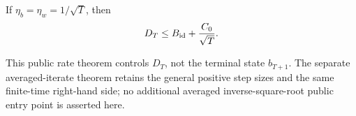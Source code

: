 \begin{corollary}
\label{cor:unpenalized-inv-sqrt}
If $\eta_b=\eta_w=1/\sqrt T$, then
\begin{equation}
  D_T\le B_{\rm id}+\frac{C_0}{\sqrt T}.
  \label{eq:unpenalized-inv-sqrt-rate}
\end{equation}
\end{corollary}

This public rate theorem controls $D_T$, not the terminal state $b_{T+1}$.
The separate
averaged-iterate theorem retains the general positive step sizes and the same
finite-time right-hand side; no additional averaged inverse-square-root public
entry point is asserted here.
